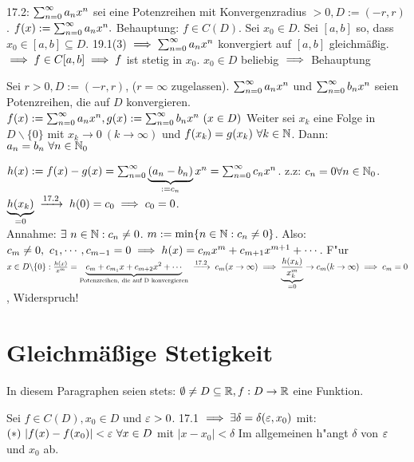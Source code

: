 \documentclass[a4paper,twoside,DIV15,BCOR12mm]{scrbook}
\begin{document}
\begin{beweis}
17.2: $\sum_{n=0}^{\infty}{a_nx^n}$ sei eine Potenzreihen mit Konvergenzradius $>0, D:=(-r, r)$. $f(x):=\sum_{n=0}^{\infty}{a_nx^n}.$ Behauptung: $f\in C(D)$. Sei $x_0 \in D$. Sei $[a, b]$ so, dass $x_0 \in [a, b] \subseteq D$. 19.1(3) $\implies \sum_{n=0}^{\infty}{a_nx^n}$ konvergiert auf $[a, b]$ gleichmäßig. $\implies f \in C[a, b] \implies f$ ist stetig in $x_0$. $x_0 \in D$ beliebig $\implies$ Behauptung
\end{beweis}

\begin{satz}
Sei $r>0, D:=(-r, r)$, ($r=\infty$ zugelassen). $\sum_{n=0}^{\infty}{a_nx^n}$ und $\sum_{n=0}^{\infty}{b_nx^n}$ seien Potenzreihen, die auf $D$ konvergieren. $f(x):=\reihenull{a_nx^n},  g(x):=\reihenull{b_nx^n}\ (x\in D)$ Weiter sei $x_k$ eine Folge in $D\backslash \{0\}$ mit $x_k \to 0\ (k\to \infty)$ und $f(x_k)=g(x_k)\ \forall k \in \mathbb{N}$. Dann: $a_n=b_n\ \forall n\in\mathbb{N}_{0}$
\end{satz}

\begin{beweis}
$h(x):=f(x)-g(x) = \sum_{n=0}^{\infty}{\underbrace{(a_n-b_n)}_{:=c_n}x^n} = \sum_{n=0}^{\infty}{c_nx^n}$. z.z: $c_n=0\forall n\in\mathbb{N}_0$. $\underbrace{h(x_k)}_{=0}\tonach{17.2} h(0)=c_0\folgt c_0=0$.\\
 Annahme: $\exists\ n\in\mathbb{N}: c_n\ne0$. $m:=\min\{n\in\mathbb{N}: c_n\ne0\}$.  Also: $c_m\ne0,\ c_1, \cdots, c_{m-1}=0 \implies h(x)=c_mx^m+c_{m+1}x^{m+1}+\cdots$. F"ur $x\in D\backslash \{0\}: \frac{h(x)}{x^m}=\underbrace{c_m+c_{m_1}x+c_{m+2}x^2+\cdots}_{\text{Potenzreihen, die auf D konvergieren}}\tonach{17.2} c_m (x \to \infty) \folgt \underbrace{\frac{h(x_k)}{x^m_k}}_{=0}\to c_m(k\to\infty) \folgt c_m=0$, Widerspruch!
\end{beweis}

\chapter{Gleichmäßige Stetigkeit}

\begin{vereinbarung}
In diesem Paragraphen seien stets: $\emptyset \ne D \subseteq \mathbb{R}, f: D \to \mathbb{R}$ eine Funktion.
\end{vereinbarung}
\begin{erinnerung}
Sei $f \in C(D), x_0 \in D$ und $\varepsilon>0$. 17.1 $\implies \exists \delta=\delta(\varepsilon,x_0)$ mit: $(*)\ |f(x)-f(x_0)|<\varepsilon\ \forall x \in D$ mit $|x-x_0|<\delta$ Im allgemeinen h"angt $\delta$ von $\varepsilon$ und $x_0$ ab.
\end{erinnerung}
\end{document}
